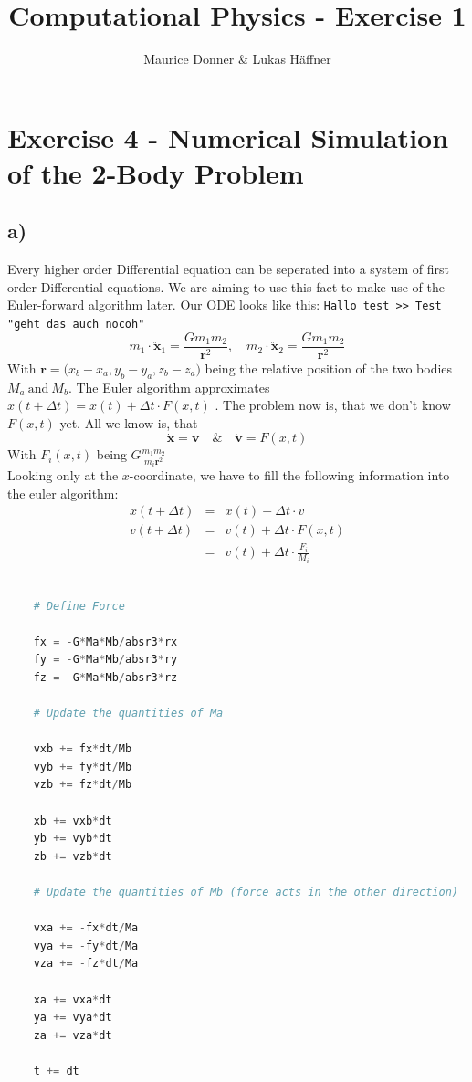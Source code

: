 \documentclass{article}
\title{Computational Physics - Exercise 1}
\author{Maurice Donner \& Lukas Häffner}
\begin{document}
\maketitle
\newpage

\section*{Exercise 4 - Numerical Simulation of the 2-Body Problem}
\subsection*{a)}

Every higher order Differential equation can be seperated into a system of
first order Differential equations. We are aiming to use this fact to make
use of the Euler-forward algorithm later. Our ODE looks like this:
    \texttt{Hallo test >> Test "geht das auch nocoh"} 
\[ 
    m_1 \cdot \ddot{\mathbf{x}}_1 = \frac{G m_1 m_2}{\mathbf{r} ^2}, \quad
    m_2 \cdot \ddot{\mathbf{x}}_2 = \frac{G m_1 m_2}{\mathbf{r} ^2}
\]
With \( \mathbf{r} = \big( x_b - x_a, y_b - y_a, z_b - z_a \big) \) being the
relative position of the two bodies \( M_a \ \text{and} \  M_b \).
The Euler algorithm approximates \( x ( t + \Delta t) = x(t) + \Delta t \cdot F(x,t) \)
. The problem now is, that we don't know \( F(x,t) \) yet. All we know is, that
\[ 
    \dot{\mathbf{x}}= \mathbf{v} \quad \& \quad \dot{\mathbf{v}}= F(x,t)
\]
 With \( F_i(x,t) \) being \( G \frac{m_1 m_2}{m_i \mathbf{r}^2 }  \) \\

Looking only at the \( x\)-coordinate, 
we have to fill the following information into the euler algorithm:
 \[ 
     \begin{array}{lcr}
	 x(t + \Delta t) & = & x(t) + \Delta t \cdot v \\ 
	 v(t+\Delta t) & = & v(t) + \Delta t \cdot F(x,t) \\
	& = & v(t) + \Delta t \cdot \frac{F_i}{M_i} 
     \end{array}
 \]
 \begin{lstlisting}[language=python]

    # Define Force
    
    fx = -G*Ma*Mb/absr3*rx
    fy = -G*Ma*Mb/absr3*ry
    fz = -G*Ma*Mb/absr3*rz

    # Update the quantities of Ma

    vxb += fx*dt/Mb
    vyb += fy*dt/Mb
    vzb += fz*dt/Mb

    xb += vxb*dt
    yb += vyb*dt
    zb += vzb*dt

    # Update the quantities of Mb (force acts in the other direction)

    vxa += -fx*dt/Ma
    vya += -fy*dt/Ma
    vza += -fz*dt/Ma

    xa += vxa*dt
    ya += vya*dt
    za += vza*dt

    t += dt
 \end{lstlisting}
 
\end{document}
